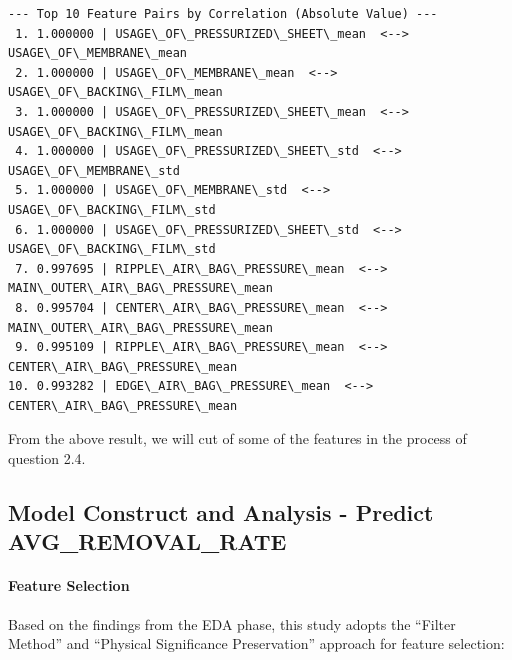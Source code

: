 \documentclass[11pt]{article}
\begin{document}
    \begin{Verbatim}[commandchars=\\\{\}]
--- Top 10 Feature Pairs by Correlation (Absolute Value) ---
 1. 1.000000 | USAGE\_OF\_PRESSURIZED\_SHEET\_mean  <-->  USAGE\_OF\_MEMBRANE\_mean
 2. 1.000000 | USAGE\_OF\_MEMBRANE\_mean  <-->  USAGE\_OF\_BACKING\_FILM\_mean
 3. 1.000000 | USAGE\_OF\_PRESSURIZED\_SHEET\_mean  <-->  USAGE\_OF\_BACKING\_FILM\_mean
 4. 1.000000 | USAGE\_OF\_PRESSURIZED\_SHEET\_std  <-->  USAGE\_OF\_MEMBRANE\_std
 5. 1.000000 | USAGE\_OF\_MEMBRANE\_std  <-->  USAGE\_OF\_BACKING\_FILM\_std
 6. 1.000000 | USAGE\_OF\_PRESSURIZED\_SHEET\_std  <-->  USAGE\_OF\_BACKING\_FILM\_std
 7. 0.997695 | RIPPLE\_AIR\_BAG\_PRESSURE\_mean  <-->
MAIN\_OUTER\_AIR\_BAG\_PRESSURE\_mean
 8. 0.995704 | CENTER\_AIR\_BAG\_PRESSURE\_mean  <-->
MAIN\_OUTER\_AIR\_BAG\_PRESSURE\_mean
 9. 0.995109 | RIPPLE\_AIR\_BAG\_PRESSURE\_mean  <-->  CENTER\_AIR\_BAG\_PRESSURE\_mean
10. 0.993282 | EDGE\_AIR\_BAG\_PRESSURE\_mean  <-->  CENTER\_AIR\_BAG\_PRESSURE\_mean
    \end{Verbatim}

    From the above result, we will cut of some of the features in the
process of question 2.4.

    \subsection{Model Construct and Analysis - Predict
AVG\_REMOVAL\_RATE}\label{model-construct-and-analysis---predict-avg_removal_rate}

    \paragraph{Feature Selection}\label{feature-selection}

Based on the findings from the EDA phase, this study adopts the ``Filter
Method'' and ``Physical Significance Preservation'' approach for feature
selection:
\end{document}
